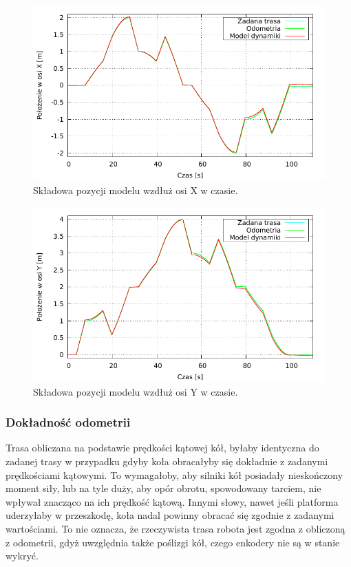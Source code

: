 		\begin{figure}[H]
			\centering
			\includegraphics[width=\textwidth]{plots/comparison_xt.pdf}
				\caption{Składowa pozycji modelu wzdłuż osi X w czasie.}
			\label{plot:comparison_xt}
		\end{figure}
		
		\begin{figure}[H]
			\centering
			\includegraphics[width=\textwidth]{plots/comparison_yt.pdf}
				\caption{Składowa pozycji modelu wzdłuż osi Y w czasie.}
			\label{plot:comparison_yt}
		\end{figure}
		
		\subsubsection{Dokładność odometrii}
			\label{sec:test_odometry}
			Trasa obliczana na podstawie prędkości kątowej kół, byłaby identyczna do zadanej trasy w przypadku gdyby koła obracałyby się dokładnie z zadanymi prędkościami kątowymi.
			To wymagałoby, aby silniki kół posiadały nieskończony moment siły, lub na tyle duży, aby opór obrotu, spowodowany tarciem, nie wpływał 
			znacząco na ich prędkość kątową. Innymi słowy, nawet jeśli platforma uderzyłaby w przeszkodę, koła nadal powinny obracać się zgodnie z zadanymi wartościami.
			To nie oznacza, że rzeczywista trasa robota jest zgodna z obliczoną z odometrii, gdyż uwzględnia także poślizgi kół, czego enkodery nie są w stanie wykryć.
			
